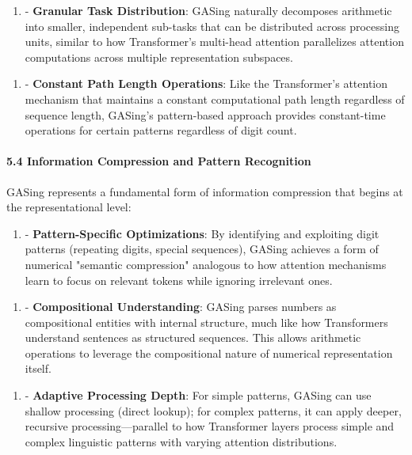 \documentclass[11pt,a4paper]{article}
\begin{document}
\begin{enumerate}
  \item - \textbf{Granular Task Distribution}: GASing naturally decomposes arithmetic into smaller, independent sub-tasks that can be distributed across processing units, similar to how Transformer's multi-head attention parallelizes attention computations across multiple representation subspaces.
\end{enumerate}

\begin{enumerate}
  \item - \textbf{Constant Path Length Operations}: Like the Transformer's attention mechanism that maintains a constant computational path length regardless of sequence length, GASing's pattern-based approach provides constant-time operations for certain patterns regardless of digit count.
\end{enumerate}

\paragraph{5.4 Information Compression and Pattern Recognition}
GASing represents a fundamental form of information compression that begins at the representational level:

\begin{enumerate}
  \item - \textbf{Pattern-Specific Optimizations}: By identifying and exploiting digit patterns (repeating digits, special sequences), GASing achieves a form of numerical "semantic compression" analogous to how attention mechanisms learn to focus on relevant tokens while ignoring irrelevant ones.
\end{enumerate}

\begin{enumerate}
  \item - \textbf{Compositional Understanding}: GASing parses numbers as compositional entities with internal structure, much like how Transformers understand sentences as structured sequences. This allows arithmetic operations to leverage the compositional nature of numerical representation itself.
\end{enumerate}

\begin{enumerate}
  \item - \textbf{Adaptive Processing Depth}: For simple patterns, GASing can use shallow processing (direct lookup); for complex patterns, it can apply deeper, recursive processing—parallel to how Transformer layers process simple and complex linguistic patterns with varying attention distributions.
\end{enumerate}
\end{document}
